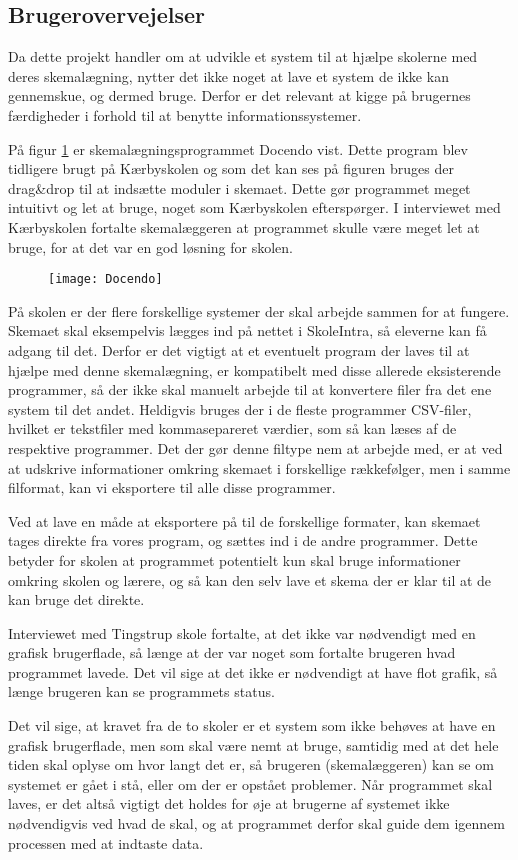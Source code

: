 \subsection{Brugerovervejelser}
\label{brugerovervejelser}
Da dette projekt handler om at udvikle et system til at hjælpe skolerne med deres skemalægning, nytter det ikke noget at lave et system de ikke kan gennemskue, og dermed bruge. Derfor er det relevant at kigge på brugernes færdigheder i forhold til at benytte informationssystemer.

På figur \ref{fig:docendo_skema} er skemalægningsprogrammet Docendo vist. Dette program blev tidligere brugt på Kærbyskolen og som det kan ses på figuren bruges der drag\&drop til at indsætte moduler i skemaet. Dette gør programmet meget intuitivt og let at bruge, noget som Kærbyskolen efterspørger. I interviewet med Kærbyskolen fortalte skemalæggeren at programmet skulle være meget let at bruge, for at det var en god løsning for skolen.

\begin{figure}[h!]
	\centering
	\texttt{[image: Docendo]}
	\label{fig:docendo_skema}
\end{figure}

På skolen er der flere forskellige systemer der skal arbejde sammen for at fungere. Skemaet skal eksempelvis lægges ind på nettet i SkoleIntra, så eleverne kan få adgang til det. Derfor er det vigtigt at et eventuelt program der laves til at hjælpe med denne skemalægning, er kompatibelt med disse allerede eksisterende programmer, så der ikke skal manuelt arbejde til at konvertere filer fra det ene system til det andet. Heldigvis bruges der i de fleste programmer CSV-filer, hvilket er tekstfiler med kommasepareret værdier, som så kan læses af de respektive programmer. Det der gør denne filtype nem at arbejde med, er at ved at udskrive informationer omkring skemaet i forskellige rækkefølger, men i samme filformat, kan vi eksportere til alle disse programmer.

Ved at lave en måde at eksportere på til de forskellige formater, kan skemaet tages direkte fra vores program, og sættes ind i de andre programmer. Dette betyder for skolen at programmet potentielt kun skal bruge informationer omkring skolen og lærere, og så kan den selv lave et skema der er klar til at de kan bruge det direkte.

Interviewet med Tingstrup skole fortalte, at det ikke var nødvendigt med en grafisk brugerflade, så længe at der var noget som fortalte brugeren hvad programmet lavede. Det vil sige at det ikke er nødvendigt at have flot grafik, så længe brugeren kan se programmets status. 

Det vil sige, at kravet fra de to skoler er et system som ikke behøves at have en grafisk brugerflade, men som skal være nemt at bruge, samtidig med at det hele tiden skal oplyse om hvor langt det er, så brugeren (skemalæggeren) kan se om systemet er gået i stå, eller om der er opstået problemer. Når programmet skal laves, er det altså vigtigt det holdes for øje at brugerne af systemet ikke nødvendigvis ved hvad de skal, og at programmet derfor skal guide dem igennem processen med at indtaste data.